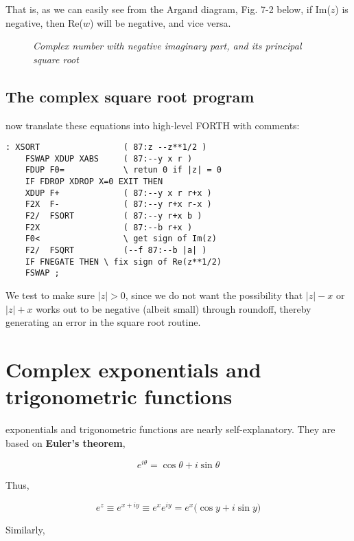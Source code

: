 That is, as we can easily see from the Argand diagram, Fig. 7-2 below, if Im($z$) is negative, then Re($w$) will be negative, and vice versa.

\begin{figure}
    \center
    \caption{\textit{Complex number with negative imaginary part, and its principal square root}}
    \label{fig:07_02}
\end{figure}

\subsection{The complex square root program}
 now translate these equations into high-level FORTH with comments:

\begin{lstlisting}
: XSORT                 ( 87:z --z**1/2 )
    FSWAP XDUP XABS     ( 87:--y x r )
    FDUP F0=            \ retun 0 if |z| = 0
    IF FDROP XDROP X=0 EXIT THEN
    XDUP F+             ( 87:--y x r r+x )
    F2X  F-             ( 87:--y r+x r-x )
    F2/  FSORT          ( 87:--y r+x b )
    F2X                 ( 87:--b r+x )
    F0<                 \ get sign of Im(z)
    F2/  FSQRT          (--f 87:--b |a| )
    IF FNEGATE THEN \ fix sign of Re(z**1/2)
    FSWAP ;
\end{lstlisting}

We test to make sure $\lvert z \rvert > 0$, since we do not want the possibility that $\lvert z \rvert - x$ or $\lvert z \rvert + x$ works out to be negative (albeit small) through roundoff, thereby generating an error in the square root routine.

\section{Complex exponentials and trigonometric functions}
 exponentials and trigonometric functions are nearly self-explanatory. They are based on \textbf{Euler’s theorem},

\begin{equation*}
  e^{i\theta} = \cos\theta + i \sin\theta
\end{equation*}

Thus,

\begin{equation}
  e^z \equiv e^{x + iy} \equiv e^x e^{iy} = e^x\big(\cos y + i \sin y\big)
\end{equation}

Similarly,

